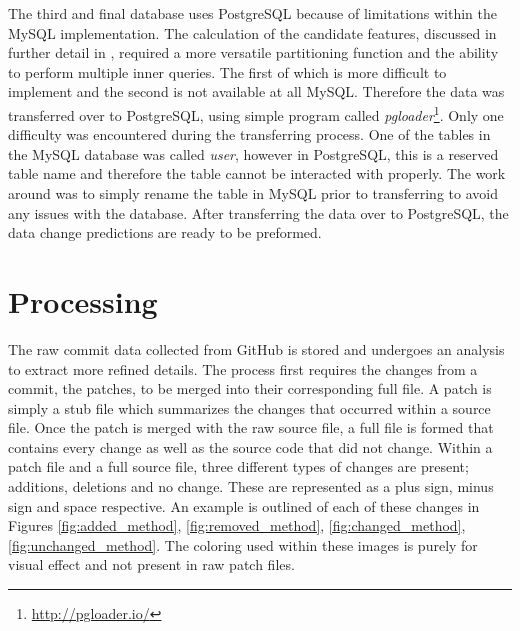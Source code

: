 The third and final database uses PostgreSQL because of limitations within the MySQL implementation. The calculation of the candidate features, discussed in further detail in , required a more versatile partitioning function and the ability to perform multiple inner queries. The first of which is more difficult to implement and the second is not available at all MySQL. Therefore the data was transferred over to PostgreSQL, using simple program called \textit{pgloader}\footnote{\url{http://pgloader.io/}}. Only one difficulty was encountered during the transferring process. One of the tables in the MySQL database was called \textit{user}, however in PostgreSQL, this is a reserved table name and therefore the table cannot be interacted with properly. The work around was to simply rename the table in MySQL prior to transferring to avoid any issues with the database. After transferring the data over to PostgreSQL, the data change predictions are ready to be preformed.

\section{Processing}
\label{sec:proccessing}

The raw commit data collected from GitHub is stored and undergoes an analysis to extract more refined details. The process first requires the changes from a commit, the patches, to be merged into their corresponding full file. A patch is simply a stub file which summarizes the changes that occurred within a source file. Once the patch is merged with the raw source file, a full file is formed that contains every change as well as the source code that did not change. Within a patch file and a full source file, three different types of changes are present; additions, deletions and no change. These are represented as a plus sign, minus sign and space respective. An example is outlined of each of these changes in Figures \ref{fig:added_method}, \ref{fig:removed_method}, \ref{fig:changed_method}, \ref{fig:unchanged_method}. The coloring used within these images is purely for visual effect and not present in raw patch files.

